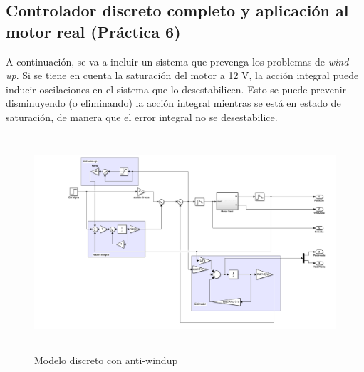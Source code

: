 \documentclass[a4paper, 12pt]{article}
\begin{document}
\subsection{Controlador discreto completo y aplicación al motor real (Práctica 6)}
A continuación, se va a incluir un sistema que prevenga los problemas de \textit{wind-up}. Si se tiene en cuenta la saturación del motor a 12 V, la acción integral puede inducir oscilaciones en el sistema que lo desestabilicen. Esto se puede prevenir disminuyendo (o eliminando) la acción integral mientras se está en estado de saturación, de manera que el error integral no se desestabilice. 
\begin{figure}[H] 
	\centering
	\includegraphics[height=8cm]{figs/p6/antiwup} 
	\caption{Modelo discreto con anti-windup} \label{antiwup}
\end{figure}
\end{document}
